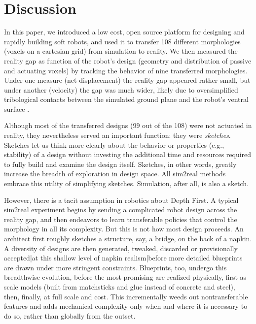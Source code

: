 \section{Discussion}
\label{sec:discussion}


In this paper, we introduced a low cost, open source platform for designing and rapidly building soft robots, and used it to transfer 
108 different morphologies (voxels on a cartesian grid) from simulation to reality.
We then measured the reality gap as function of the robot's design (geometry and distribution of passive and actuating voxels) by tracking the behavior of nine transferred morphologies.
Under one measure (net displacement) the reality gap appeared rather small, but under another (velocity) the gap was much wider, likely due to oversimplified tribological contacts between the simulated ground plane and the robot's ventral surface \cite{majidi2013influence}.

Although most of the transferred designs (99 out of the 108) were not actuated in reality, they nevertheless served an important function:
they were \textit{sketches}.
Sketches let us think more clearly about the behavior or properties (e.g., stability) of a design without investing the additional time and resources required to fully build and examine the design itself.
Sketches, in other words, greatly increase the breadth of exploration in design space.
All sim2real methods embrace this utility of simplifying sketches.
Simulation, after all, is also a sketch.

However, there is a tacit assumption in robotics about Depth First.
A typical sim2real experiment begins by sending a
complicated robot design across the reality gap,
and then endeavors to learn transferable policies that control the morphology in all its complexity.
But this is not how most design proceeds.
An architect first roughly sketches a structure, say, a bridge, on the back of a napkin.
A diversity of designs are then generated, tweaked, discarded or provisionally accepted|at this shallow level of napkin realism|before more detailed blueprints are drawn under more stringent constraints.
Blueprints, too, undergo this breadthwise evolution, before the most promising are realized physically, first as scale models (built from matchsticks and glue instead of concrete and steel), then, finally, at full scale and cost.
This incrementally weeds out nontransferable features and adds mechanical complexity only when and where it is necessary to do so, rather than globally from the outset.

